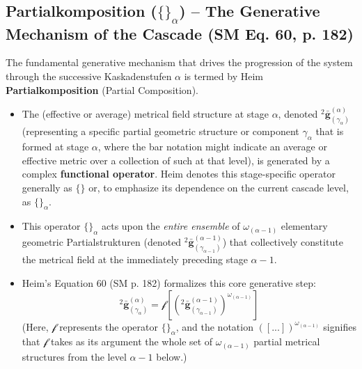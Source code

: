 \documentclass[
    12pt,              %
    a4paper,           %
    headings=normal,   %
    twoside=true,      %
    BCOR=8mm,          %
]{scrbook}
\newcommand{\kaskadenstufe}{\alpha}
\begin{document}
\subsection{Partialkomposition (\(\{\}_\alpha\)) – The Generative Mechanism of the Cascade (SM Eq. 60, p. 182)}
\label{sec:ch9_1_3_partialkomposition}
The fundamental generative mechanism that drives the progression of the system through the successive Kaskadenstufen \(\kaskadenstufe\) is termed by Heim \textbf{Partialkomposition} (Partial Composition).
\begin{itemize}
    \item   The (effective or average) metrical field structure at stage \(\kaskadenstufe\), denoted \({}^2\bar{\mathbf{g}}^{(\alpha)}_{(\gamma_{\alpha})}\) (representing a specific partial geometric structure or component \(\gamma_\alpha\) that is formed at stage \(\kaskadenstufe\), where the bar notation might indicate an average or effective metric over a collection of such at that level), is generated by a complex \textbf{functional operator}. Heim denotes this stage-specific operator generally as \(\{\}\) or, to emphasize its dependence on the current cascade level, as \(\{\}_\alpha\).
    \item   This operator \(\{\}_\alpha\) acts upon the \textit{entire ensemble} of \(\omega_{(\alpha-1)}\) elementary geometric Partialstrukturen (denoted \({}^2\bar{\mathbf{g}}^{(\alpha-1)}_{(\gamma_{\alpha-1})}\)) that collectively constitute the metrical field at the immediately preceding stage \(\kaskadenstufe-1\).
    \item   Heim’s Equation 60 (SM p. 182) formalizes this core generative step:
        \begin{equation} \label{eq:original_partialkomposition} %
        {}^{2}\bar{\mathbf{g}}^{(\alpha)}_{(\gamma_{\alpha})} = \mathcal{f} \left[ ({}^{2}\bar{\mathbf{g}}^{(\alpha-1)}_{(\gamma_{\alpha-1})})^{\omega_{(\alpha-1)}} \right]
        \end{equation}
        (Here, \(\mathcal{f}\) represents the operator \(\{\}_\alpha\), and the notation \(([...])^{\omega_{(\alpha-1)}}\) signifies that \(\mathcal{f}\) takes as its argument the whole set of \(\omega_{(\alpha-1)}\) partial metrical structures from the level \(\kaskadenstufe-1\) below.)

\end{itemize}
\end{document}
